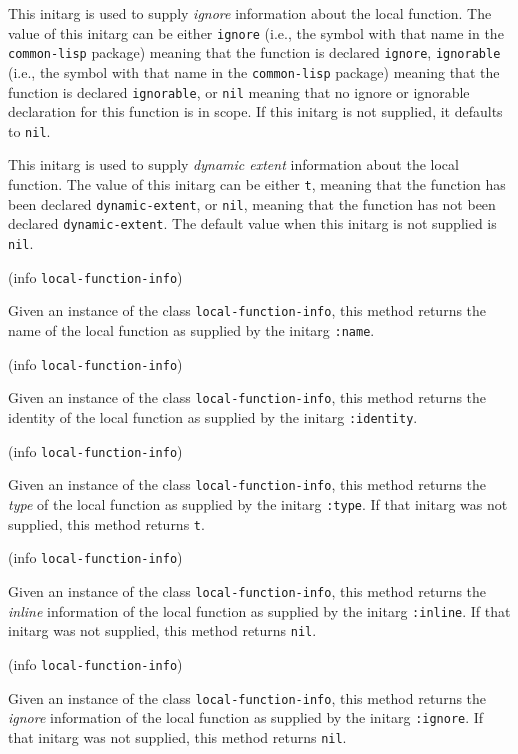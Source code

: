
This initarg is used to supply \emph{ignore} information about the
local function.  The value of this initarg can be either
\texttt{ignore} (i.e., the symbol with that name in the
\texttt{common-lisp} package) meaning that the function is declared
\texttt{ignore}, \texttt{ignorable} (i.e., the symbol with that name
in the \texttt{common-lisp} package) meaning that the function is
declared \texttt{ignorable}, or \texttt{nil} meaning that no ignore or
ignorable declaration for this function is in scope.  If this initarg
is not supplied, it defaults to \texttt{nil}.


This initarg is used to supply \emph{dynamic extent} information about
the local function.  The value of this initarg can be either
\texttt{t}, meaning that the function has been declared
\texttt{dynamic-extent}, or \texttt{nil}, meaning that the function
has not been declared \texttt{dynamic-extent}.  The default value when
this initarg is not supplied is \texttt{nil}. 

 {(info {\tt local-function-info})}

Given an instance of the class \texttt{local-function-info}, this
method returns the name of the local function as supplied by the
initarg \texttt{:name}.

 {(info {\tt local-function-info})}

Given an instance of the class \texttt{local-function-info}, this
method returns the identity of the local function as supplied by the
initarg \texttt{:identity}.

 {(info {\tt local-function-info})}

Given an instance of the class \texttt{local-function-info}, this
method returns the \emph{type} of the local function as supplied by the
initarg \texttt{:type}.  If that initarg was not supplied, this method
returns \texttt{t}.

 {(info {\tt local-function-info})}

Given an instance of the class \texttt{local-function-info}, this
method returns the \emph{inline} information of the local function as
supplied by the initarg \texttt{:inline}.  If that initarg was not
supplied, this method returns \texttt{nil}.

 {(info {\tt local-function-info})}

Given an instance of the class \texttt{local-function-info}, this
method returns the \emph{ignore} information of the local function as
supplied by the initarg \texttt{:ignore}.  If that initarg was not
supplied, this method returns \texttt{nil}.

